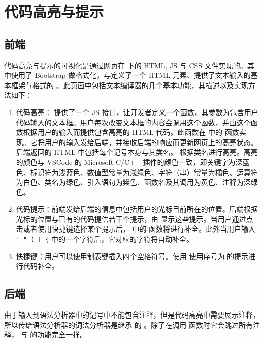 \section{代码高亮与提示}

\subsection{前端}

代码高亮与提示的可视化是通过网页在  下的 HTML, JS 与 CSS 文件实现的。其中使用了 Bootstrap 做格式化，与定义了一个 HTML 元素、提供了文本输入的基本框架与格式的 \href{https://github.com/WebCoder49/code-input}{} 。此页面中包括文本编译器的几个基本功能，其描述以及实现方法如下：

\begin{enumerate}
    \item 代码高亮： 提供了一个 JS 接口，让开发者定义一个函数，其参数为包含用户代码输入的文本框。用户每次改变文本框的内容会调用这个函数，并由这个函数根据用户的输入而提供包含高亮的 HTML 代码。此函数在  中的  函数实现。它将用户的输入发给后端，并接收后端的响应而更新网页上的高亮状态。后端返回的 HTML 中包括每个记号本身与其类名。 根据类名进行高亮。高亮的颜色与 VSCode 的 Microsoft C/C++ 插件的颜色一致，即关键字为深蓝色、标识符为浅蓝色、数值型常量为浅绿色、字符（串）常量为橘色、运算符为白色、类名为绿色、引入语句为紫色、函数名及其调用为黄色、注释为深绿色。
    \item 代码提示：前端发给后端的信息中包括用户的光标目前所在的位置。后端根据光标的位置与已有的代码提供若干个提示，由  显示这些提示。当用户通过点击或者使用快捷键选择某个提示后， 中的  函数将进行补全。此外当用户输入 \lstinline`' " ( [ {` 中的一个字符后，它对应的字符将自动补全。
    \item 快捷键：用户可以使用制表键插入四个空格符号。使用  使用序号为  的提示进行代码补全。
\end{enumerate}

\subsection{后端}

由于输入到语法分析器中的记号中不能包含注释，但是代码高亮中需要展示注释，所以传给语法分析器的词法分析器是继承  的 。除了在调用  函数时它会跳过所有注释， 与  的功能完全一样。

